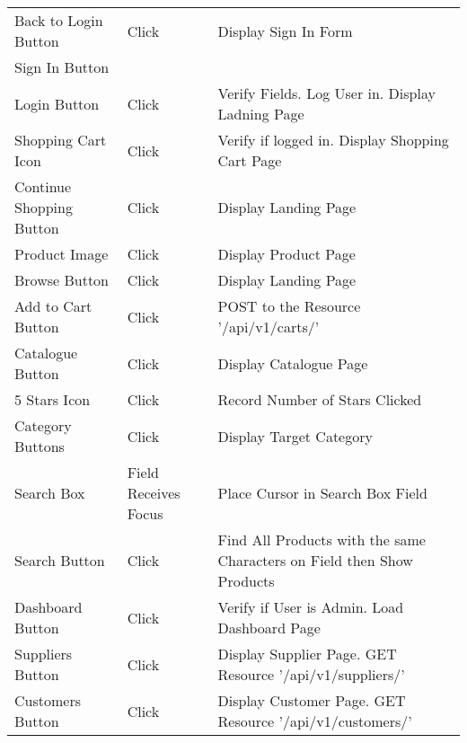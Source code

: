 \documentclass[12pt]{article}
\begin{document}
\begin{center}
	\begin{tabular}{ m{1.5in} | m{1.5in} | m{1.5in} }
	Back to Login Button & Click 				& Display Sign In Form \\ \cline{1-1}
	Sign In Button 		& 						& \\
	\hline
	Login Button 		& Click 					& Verify Fields. Log User in. Display Ladning Page \\
	\hline
	Shopping Cart Icon 	& Click 					& Verify if logged in. Display Shopping Cart Page \\
	\hline
	Continue Shopping Button & Click 				& Display Landing Page \\
	\hline 
	Product Image 		& Click 					& Display Product Page \\
	\hline 
	Browse Button 		& Click 					& Display Landing Page \\
	\hline
	Add to Cart Button 	& Click 					& POST to the Resource '/api/v1/carts/' \\
	\hline 
	Catalogue Button 	& Click 					& Display Catalogue Page \\
	\hline 
	5 Stars Icon 		& Click 					& Record Number of Stars Clicked \\
	\hline
	Category Buttons 	& Click 					& Display Target Category \\
	\hline 
	Search Box 			& Field Receives Focus 	& Place Cursor in Search Box Field \\
	\hline
	Search Button 		& Click 					& Find All Products with the same Characters on Field then Show Products \\
	\hline
	Dashboard Button 	& Click 					& Verify if User is Admin. Load Dashboard Page \\
	\hline
	Suppliers Button 	& Click 					& Display Supplier Page. GET Resource '/api/v1/suppliers/' \\
	\hline
	Customers Button 	& Click 					& Display Customer Page. GET Resource '/api/v1/customers/' \\		
	\end{tabular}

	\newpage	
	

\end{center}
\end{document}
